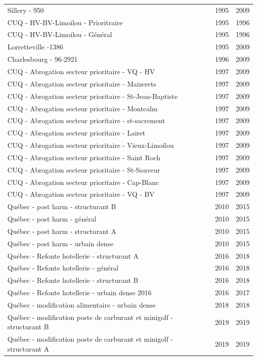 {\begin{longtable}{p{10cm}cc}
Sillery - 950 & 1995 & 2009 \\
CUQ - HV-BV-Limoilou - Prioritraire & 1995 & 1996 \\
CUQ - HV-BV-Limoilou - Général & 1995 & 1996 \\
Lorretteville -1386 & 1995 & 2009 \\
Charlesbourg - 96-2921 & 1996 & 2009 \\
CUQ - Abrogation secteur prioritaire - VQ - HV & 1997 & 2009 \\
CUQ - Abrogation secteur prioritaire - Maizerets & 1997 & 2009 \\
CUQ - Abrogation secteur prioritaire - St-Jean-Baptiste & 1997 & 2009 \\
CUQ - Abrogation secteur prioritaire - Montcalm & 1997 & 2009 \\
CUQ - Abrogation secteur prioritaire - st-sacrement & 1997 & 2009 \\
CUQ - Abrogation secteur prioritaire - Lairet & 1997 & 2009 \\
CUQ - Abrogation secteur prioritaire - Vieux-Limoilou & 1997 & 2009 \\
CUQ - Abrogation secteur prioritaire - Saint Roch & 1997 & 2009 \\
CUQ - Abrogation secteur prioritaire - St-Sauveur & 1997 & 2009 \\
CUQ - Abrogation secteur prioritaire - Cap-Blanc & 1997 & 2009 \\
CUQ - Abrogation secteur prioritaire - VQ - BV & 1997 & 2009 \\
Québec - post harm - structurant B & 2010 & 2015 \\
Québec - post harm - général & 2010 & 2015 \\
Québec - post harm - structurant A & 2010 & 2015 \\
Québec - post harm - urbain dense & 2010 & 2015 \\
Québec - Refonte hotellerie - structurant A & 2016 & 2018 \\
Québec - Refonte hotellerie - général & 2016 & 2018 \\
Québec - Refonte hotellerie - structurant B & 2016 & 2018 \\
Québec - Refonte hotellerie - urbain dense 2016 & 2016 & 2017 \\
Québec - modification alimentaire - urbain dense & 2018 & 2018 \\
Québec - modification poste de carburant et minigolf - structurant B & 2019 & 2019 \\
Québec - modification poste de carburant et minigolf - structurant A & 2019 & 2019 \\

\end{longtable}}
